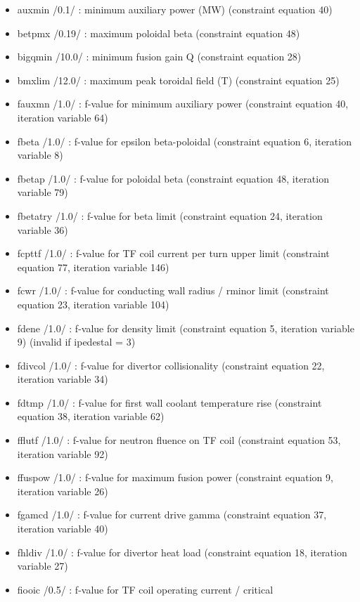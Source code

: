 \documentclass[]{article}
\begin{document}
\begin{itemize}
\itemsep1pt\parskip0pt
\item
  auxmin /0.1/ : minimum auxiliary power (MW) (constraint equation 40)
\item
  betpmx /0.19/ : maximum poloidal beta (constraint equation 48)
\item
  bigqmin /10.0/ : minimum fusion gain Q (constraint equation 28)
\item
  bmxlim /12.0/ : maximum peak toroidal field (T) (constraint equation
  25)
\item
  fauxmn /1.0/ : f-value for minimum auxiliary power (constraint
  equation 40, iteration variable 64)
\item
  fbeta /1.0/ : f-value for epsilon beta-poloidal (constraint equation
  6, iteration variable 8)
\item
  fbetap /1.0/ : f-value for poloidal beta (constraint equation 48,
  iteration variable 79)
\item
  fbetatry /1.0/ : f-value for beta limit (constraint equation 24,
  iteration variable 36)
\item
  fcpttf /1.0/ : f-value for TF coil current per turn upper limit
  (constraint equation 77, iteration variable 146)
\item
  fcwr /1.0/ : f-value for conducting wall radius / rminor limit
  (constraint equation 23, iteration variable 104)
\item
  fdene /1.0/ : f-value for density limit (constraint equation 5,
  iteration variable 9) (invalid if ipedestal = 3)
\item
  fdivcol /1.0/ : f-value for divertor collisionality (constraint
  equation 22, iteration variable 34)
\item
  fdtmp /1.0/ : f-value for first wall coolant temperature rise
  (constraint equation 38, iteration variable 62)
\item
  fflutf /1.0/ : f-value for neutron fluence on TF coil (constraint
  equation 53, iteration variable 92)
\item
  ffuspow /1.0/ : f-value for maximum fusion power (constraint equation
  9, iteration variable 26)
\item
  fgamcd /1.0/ : f-value for current drive gamma (constraint equation
  37, iteration variable 40)
\item
  fhldiv /1.0/ : f-value for divertor heat load (constraint equation 18,
  iteration variable 27)
\item
  fiooic /0.5/ : f-value for TF coil operating current / critical

\end{itemize}
\end{document}
